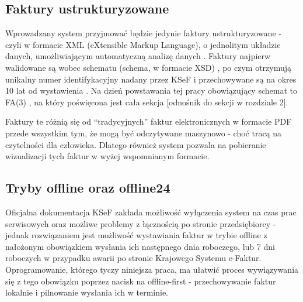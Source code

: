 \subsection{Faktury ustrukturyzowane}
Wprowadzany system przyjmować będzie jedynie faktury ustrukturyzowane - czyli w formacie XML (eXtensible Markup Language), o jednolitym układzie danych, umożliwiającym automatyczną analizę danych \parencite{structured_invoice_2025}. Faktury najpierw walidowane są wobec schematu (schema, w formacie XSD) \parencite{structured_invoice_2025}, po czym otrzymują unikalny numer identifykacyjny nadany przez KSeF i przechowywane są na okres 10 lat od wystawienia \parencite{ministerstwo_finansow_pytania_2025}. Na dzień powstawania tej pracy obowiązujący schemat to FA(3) \parencite{structured_invoice_2025}, na który poświęcona jest cała sekcja [odnośnik do sekcji w rozdziale 2]. 

Faktury te różnią się od \enquote{tradycyjnych} faktur elektronicznych w formacie PDF przede wszystkim tym, że mogą być odczytywane maszynowo - choć tracą na czytelności dla człowieka. Dlatego również system pozwala na pobieranie wizualizacji tych faktur w wyżej wspomnianym formacie.

\subsection{Tryby offline oraz offline24}
Oficjalna dokumentacja KSeF zakłada możliwość wyłączenia system na czas prac serwisowych \parencite{mf_offline_2025} oraz możliwe problemy z łącznością po stronie przedsiębiorcy \parencite{mf_offline24_2025} - jednak rozwiązaniem jest możliwość wystawiania faktur w trybie offline z nałożonym obowiązkiem wysłania ich następnego dnia roboczego, lub 7 dni roboczych w przypadku awarii po stronie Krajowego Systemu e-Faktur. Oprogramowanie, którego tyczy niniejsza praca, ma ułatwić proces wywiązywania się z tego obowiązku poprzez nacisk na offline-first - przechowywanie faktur lokalnie i pilnowanie wysłania ich w terminie. 

